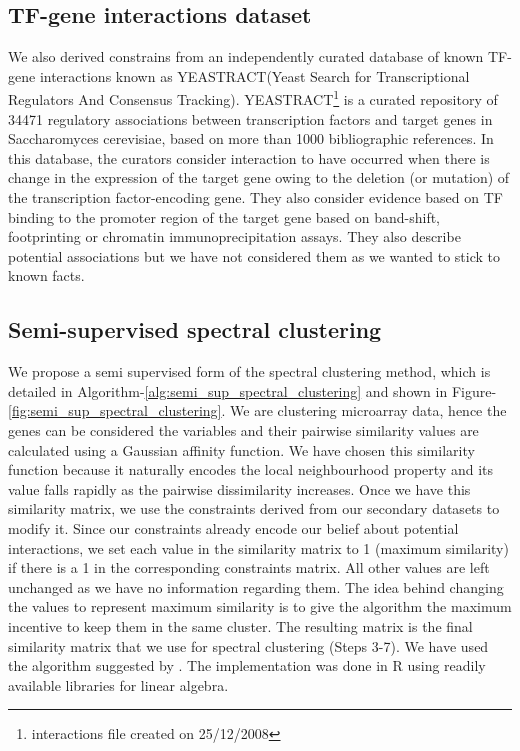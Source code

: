 \subsection{TF-gene interactions dataset} \label{yeastract-db}
We also derived constrains from an independently curated database of known TF-gene interactions known as YEASTRACT(Yeast Search for Transcriptional Regulators And Consensus Tracking). 
YEASTRACT\footnote{interactions file created on 25/12/2008} \citep{Teixeira06yeastract} is a curated repository of 34471 regulatory associations between transcription factors and 
target genes in Saccharomyces cerevisiae, based on more than 1000 bibliographic references. In this database, the curators consider interaction to have occurred when there is change in the expression of the target gene owing to the deletion (or mutation) of the transcription factor-encoding gene. They also consider evidence based on TF binding to the promoter region of the target gene based on band-shift, footprinting or chromatin immunoprecipitation assays. They also describe potential associations but we have not considered them as we wanted to stick to known facts. 

\subsection{Semi-supervised spectral clustering} \label{sec:sssc}
We propose a semi supervised form of the spectral clustering method, which is detailed in Algorithm-\ref{alg:semi_sup_spectral_clustering} and shown in Figure-\ref{fig:semi_sup_spectral_clustering}. We are clustering microarray data, hence the genes can be considered the variables and their pairwise similarity values are calculated using a Gaussian affinity function. We have chosen this similarity function because it naturally encodes the local neighbourhood property and its value falls rapidly as the pairwise dissimilarity increases. Once we have this similarity matrix, we use the constraints derived from our secondary datasets to modify it. Since our constraints already encode our belief about potential interactions, we set each value in the similarity matrix to 1 (maximum similarity) if there is a 1 in the corresponding constraints matrix. All other values are left unchanged as we have no information regarding them. The idea behind changing the values to represent maximum similarity is to give the algorithm the maximum incentive to keep them in the same cluster. The resulting matrix is the final similarity matrix that we use for spectral clustering (Steps 3-7). We have used the algorithm suggested by \citet{ng2001onspectral}. The implementation was done in R using readily available libraries for linear algebra. 

